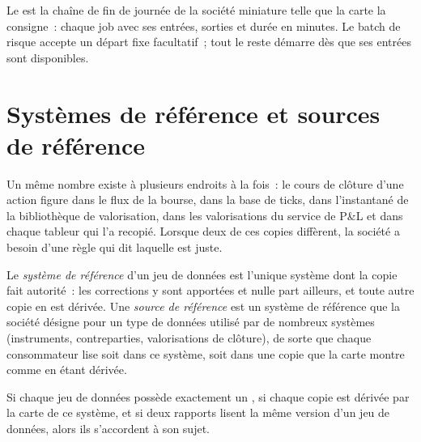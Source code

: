 Le  est la chaîne de fin de journée de la société miniature telle que la carte la consigne~: chaque job avec ses
entrées, sorties et durée en minutes. Le batch de risque accepte un départ fixe facultatif~; tout le reste démarre dès que ses entrées sont disponibles.

\label{lst:pl:the-platform-map:jobs}

\section{Systèmes de référence et sources de référence}

Un même nombre existe à plusieurs endroits à la fois~: le cours de clôture d'une action figure dans le flux de la bourse, dans la base de ticks, dans
l'instantané de la bibliothèque de valorisation, dans les valorisations du service de P\&L et dans chaque tableur qui l'a recopié. Lorsque deux de ces copies
diffèrent, la société a besoin d'une règle qui dit laquelle est juste.

\begin{definition}\label{def:pl:the-platform-map:sor}
Le \emph{système de référence} d'un jeu de données est l'unique système dont la copie fait autorité~: les corrections
y sont apportées et nulle part ailleurs, et toute autre copie en est dérivée. Une \emph{source de référence} est un système de
référence que la société désigne pour un type de données utilisé par de nombreux systèmes (instruments, contreparties, valorisations de clôture), de sorte que
chaque consommateur lise soit dans ce système, soit dans une copie que la carte montre comme en étant dérivée.
\end{definition}

\begin{proposition}\label{prop:pl:the-platform-map:oneowner}
Si chaque jeu de données possède exactement un , si chaque copie est dérivée par la carte de ce système, et si deux rapports lisent la
même version d'un jeu de données, alors ils s'accordent à son sujet.
\end{proposition}

